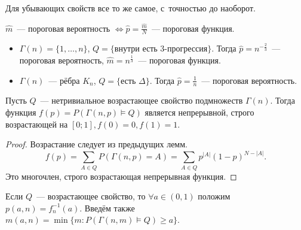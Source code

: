 \documentclass{article}
\begin{document}
\begin{remark}
	Для убывающих свойств все то же самое, с~точностью до наоборот.
\end{remark}
\begin{remark}
	$\hat{m}$~--- пороговая вероятность $\Leftrightarrow \hat{p} =
	\frac{\hat{m}}{N}$~--- пороговая функция.
\end{remark}

\begin{example}
	\begin{itemize}
		\item $\Gamma(n) = \{1, \ldots, n\}$, $Q = \{\text{внутри есть
			3-прогрессия}\}$. Тогда $\hat{p} = n^{-\frac{2}{3}}$~--- пороговая
			вероятность, $\hat{m} = n^{\frac{1}{3}}$~--- пороговая функция.
		\item $\Gamma(n)$~--- рёбра $K_n$, $Q = \{\text{есть }\Delta\}$. Тогда
			$\hat{p} = \frac{1}{n}$~--- пороговая вероятность.
	\end{itemize}
\end{example}

\begin{claim}
	Пусть $Q$~--- нетривиальное возрастающее свойство подмножеств $\Gamma(n)$.
	Тогда функция $f(p) = P(\Gamma(n, p) \models Q)$ является непрерывной, строго
	возрастающей на $[0; 1], f(0) = 0, f(1) = 1$.
\end{claim}
\begin{proof}
	Возрастание следует из предыдущих лемм.
	$$f(p) = \sum\limits_{A \in Q} P(\Gamma(n, p) = A) =
	\sum\limits_{A \in Q} p^{|A|}(1 - p)^{N - |A|}.$$
	Это многочлен, строго возрастающая непрерывная функция.
\end{proof}

\begin{definition}
	Если $Q$~--- возрастающее свойство, то $\forall a \in (0, 1)$ положим $p(a, n)
	= f_n^{-1}(a)$. Введём также $m(a, n) = \min \{m: P(\Gamma(n, m) \models Q)
	\ge a\}$.
\end{definition}
\end{document}
